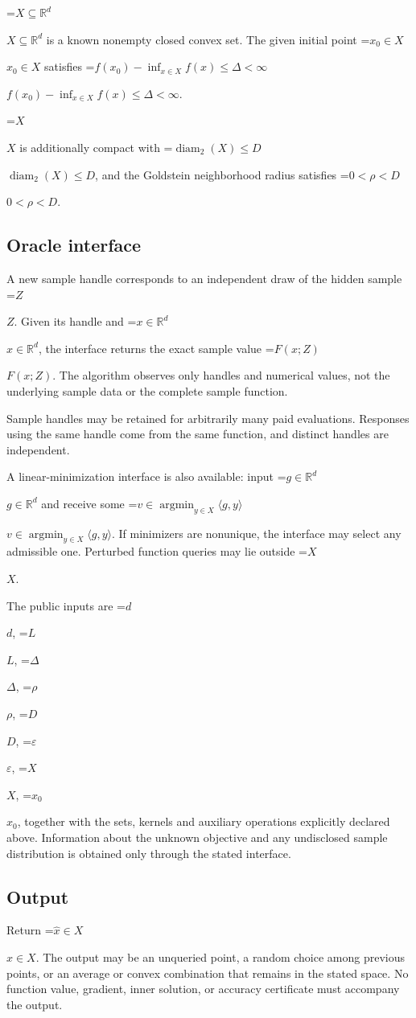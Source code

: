 \documentclass[10pt,a4paper]{article}
\newcommand{\AtlasMath}[1]{\par\begingroup\centering\setbox0=\hbox{$\displaystyle #1$}\ifdim\wd0>1.4\linewidth\typeout{ATLAS WIDE FORMULA: \the\wd0}\fi\ifdim\wd0>\linewidth\resizebox{\linewidth}{!}{\box0}\else\box0\fi\par\endgroup}
\newcommand{\AtlasInlineMath}[1]{\begingroup\setbox0=\hbox{$#1$}\ifdim\wd0>.4\linewidth\endgroup\AtlasMath{#1}\else\endgroup$#1$\fi}
\begin{document}
\AtlasInlineMath{X\subseteq\mathbb{R}^d} is a known nonempty closed convex set. The given initial point \AtlasInlineMath{x_0\in X} satisfies \AtlasInlineMath{f(x_0)-\inf_{x\in X}f(x)\le\Delta<\infty}.

\AtlasInlineMath{X} is additionally compact with \AtlasInlineMath{\operatorname{diam}_2(X)\le D}, and the Goldstein neighborhood radius satisfies \AtlasInlineMath{0<\rho<D}.

\subsection{Oracle interface}
A new sample handle corresponds to an independent draw of the hidden sample \AtlasInlineMath{Z}. Given its handle and \AtlasInlineMath{x\in \mathbb{R}^d}, the interface returns the exact sample value \AtlasInlineMath{F(x;Z)}. The algorithm observes only handles and numerical values, not the underlying sample data or the complete sample function.

Sample handles may be retained for arbitrarily many paid evaluations. Responses using the same handle come from the same function, and distinct handles are independent.

A linear-minimization interface is also available: input \AtlasInlineMath{g\in\mathbb{R}^d} and receive some \AtlasInlineMath{v\in\operatorname{argmin}_{y\in X}\langle g,y\rangle}. If minimizers are nonunique, the interface may select any admissible one. Perturbed function queries may lie outside \AtlasInlineMath{X}.

The public inputs are \AtlasInlineMath{d}, \AtlasInlineMath{L}, \AtlasInlineMath{\Delta}, \AtlasInlineMath{\rho}, \AtlasInlineMath{D}, \AtlasInlineMath{\varepsilon}, \AtlasInlineMath{X}, \AtlasInlineMath{x_0}, together with the sets, kernels and auxiliary operations explicitly declared above. Information about the unknown objective and any undisclosed sample distribution is obtained only through the stated interface.

\subsection{Output}
Return \AtlasInlineMath{\widehat{x}\in X}. The output may be an unqueried point, a random choice among previous points, or an average or convex combination that remains in the stated space. No function value, gradient, inner solution, or accuracy certificate must accompany the output.
\end{document}
